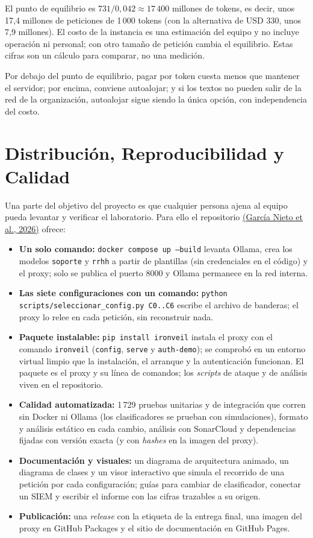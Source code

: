 \documentclass[11pt,letterpaper]{article}
\newcommand{\citeapa}[2]{\hyperlink{#1}{#2}}
\begin{document}
{\footnotesize El punto de equilibrio es $731/0{,}042 \approx 17\,400$ millones de tokens, es decir, unos 17,4 millones de peticiones de 1\,000 tokens (con la alternativa de USD 330, unos 7,9 millones). El costo de la instancia es una estimación del equipo y no incluye operación ni personal; con otro tamaño de petición cambia el equilibrio. Estas cifras son un cálculo para comparar, no una medición.}

Por debajo del punto de equilibrio, pagar por token cuesta menos que mantener el servidor; por encima, conviene autoalojar; y si los textos no pueden salir de la red de la organización, autoalojar sigue siendo la única opción, con independencia del costo.

\section{Distribución, Reproducibilidad y Calidad}
\label{sec:distribucion}

Una parte del objetivo del proyecto es que cualquier persona ajena al equipo pueda levantar y verificar el laboratorio. Para ello el repositorio \citeapa{garcia2026}{(García Nieto et al., 2026)} ofrece:

\begin{itemize}[leftmargin=1.2cm, itemsep=2pt]
\item \textbf{Un solo comando:} \texttt{docker compose up --build} levanta Ollama, crea los modelos \texttt{soporte} y \texttt{rrhh} a partir de plantillas (sin credenciales en el código) y el proxy; solo se publica el puerto 8000 y Ollama permanece en la red interna.
\item \textbf{Las siete configuraciones con un comando:} \texttt{python scripts/seleccionar\_config.py C0..C6} escribe el archivo de banderas; el proxy lo relee en cada petición, sin reconstruir nada.
\item \textbf{Paquete instalable:} \texttt{pip install ironveil} instala el proxy con el comando \texttt{ironveil} (\texttt{config}, \texttt{serve} y \texttt{auth-demo}); se comprobó en un entorno virtual limpio que la instalación, el arranque y la autenticación funcionan. El paquete es el proxy y su línea de comandos; los \emph{scripts} de ataque y de análisis viven en el repositorio.
\item \textbf{Calidad automatizada:} 1\,729 pruebas unitarias y de integración que corren sin Docker ni Ollama (los clasificadores se prueban con simulaciones), formato y análisis estático en cada cambio, análisis con SonarCloud y dependencias fijadas con versión exacta (y con \emph{hashes} en la imagen del proxy).
\item \textbf{Documentación y visuales:} un diagrama de arquitectura animado, un diagrama de clases y un visor interactivo que simula el recorrido de una petición por cada configuración; guías para cambiar de clasificador, conectar un SIEM y escribir el informe con las cifras trazables a su origen.
\item \textbf{Publicación:} una \emph{release} con la etiqueta de la entrega final, una imagen del proxy en GitHub Packages y el sitio de documentación en GitHub Pages.
\end{itemize}
\end{document}

